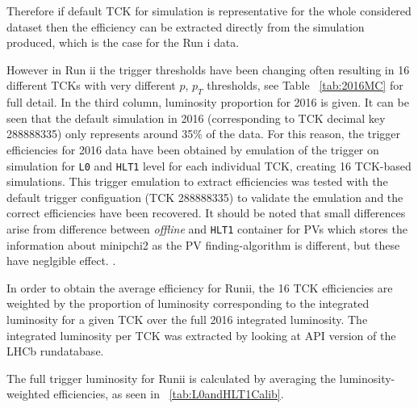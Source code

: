 Therefore if default TCK for simulation is representative for the whole considered dataset then the efficiency can be extracted directly from the simulation produced, which is the case for the Run \Rn{1} data.

However in Run \Rn{2} the trigger thresholds have been changing often resulting in 16 different TCKs with very different $p$, $p_{T}$ thresholds, see Table ~\autoref{tab:2016MC} for full detail. In the third column, luminosity proportion for 2016 is given. It can be seen that the default simulation in 2016 (corresponding to TCK decimal key 288888335) only represents around 35\% of the data. For this reason, the trigger efficiencies for 2016 data have been obtained by emulation of the trigger on simulation for \texttt{L0} and \texttt{HLT1} level for each individual TCK, creating 16 TCK-based simulations.  This trigger emulation to extract efficiencies was tested with the default trigger configuation (TCK 288888335) to validate the emulation and the correct efficiencies have been recovered. It should be noted that small differences arise from difference between \textit{offline} and \texttt{HLT1} container for \gls{PV}s which stores the information about \gls{minipchi2} as the \gls{PV} finding-algorithm is different, but these have neglgible effect. .

In order to obtain the average efficiency for Run\Rn{2}, the 16 TCK efficiencies are weighted by the proportion of luminosity corresponding to the integrated luminosity for a given TCK over the full 2016 integrated luminosity. The integrated luminosity per TCK was extracted by looking at API version of the LHCb rundatabase. 

The full trigger luminosity for Run\Rn{2} is calculated by averaging the luminosity-weighted efficiencies, as seen in ~\autoref{tab:L0andHLT1Calib}.


